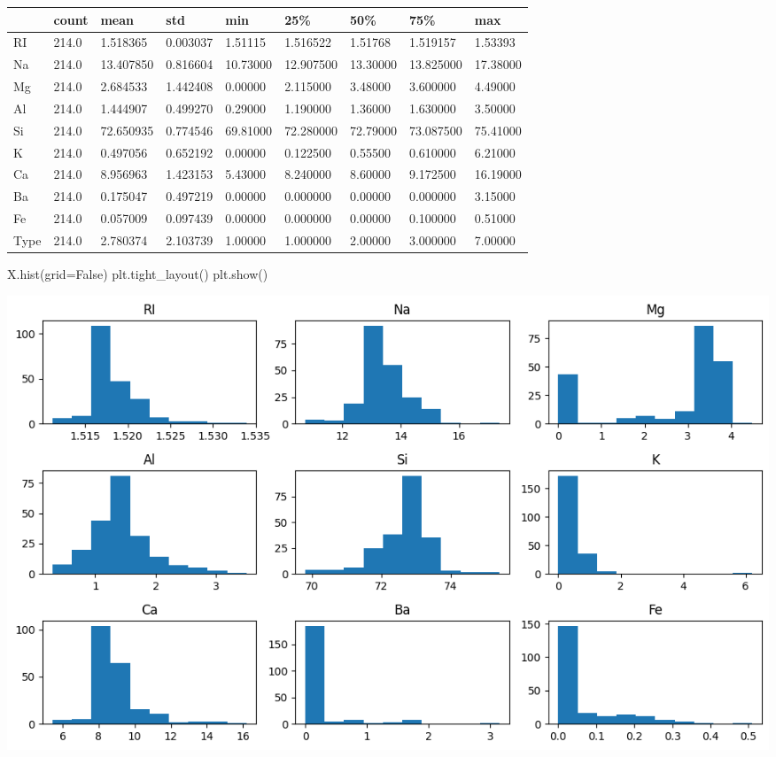 \documentclass[
  11pt,
]{article}
\newenvironment{Shaded}{\begin{snugshade}}{\end{snugshade}}
\newcommand{\NormalTok}[1]{\textcolor[rgb]{0.00,0.23,0.31}{#1}}
\newcommand{\OperatorTok}[1]{\textcolor[rgb]{0.37,0.37,0.37}{#1}}
\newcommand{\VariableTok}[1]{\textcolor[rgb]{0.07,0.07,0.07}{#1}}
\begin{document}
\begin{longtable}[]{@{}lllllllll@{}}
\toprule\noalign{}
& count & mean & std & min & 25\% & 50\% & 75\% & max \\
\midrule\noalign{}
\endhead
\bottomrule\noalign{}
\endlastfoot
RI & 214.0 & 1.518365 & 0.003037 & 1.51115 & 1.516522 & 1.51768 &
1.519157 & 1.53393 \\
Na & 214.0 & 13.407850 & 0.816604 & 10.73000 & 12.907500 & 13.30000 &
13.825000 & 17.38000 \\
Mg & 214.0 & 2.684533 & 1.442408 & 0.00000 & 2.115000 & 3.48000 &
3.600000 & 4.49000 \\
Al & 214.0 & 1.444907 & 0.499270 & 0.29000 & 1.190000 & 1.36000 &
1.630000 & 3.50000 \\
Si & 214.0 & 72.650935 & 0.774546 & 69.81000 & 72.280000 & 72.79000 &
73.087500 & 75.41000 \\
K & 214.0 & 0.497056 & 0.652192 & 0.00000 & 0.122500 & 0.55500 &
0.610000 & 6.21000 \\
Ca & 214.0 & 8.956963 & 1.423153 & 5.43000 & 8.240000 & 8.60000 &
9.172500 & 16.19000 \\
Ba & 214.0 & 0.175047 & 0.497219 & 0.00000 & 0.000000 & 0.00000 &
0.000000 & 3.15000 \\
Fe & 214.0 & 0.057009 & 0.097439 & 0.00000 & 0.000000 & 0.00000 &
0.100000 & 0.51000 \\
Type & 214.0 & 2.780374 & 2.103739 & 1.00000 & 1.000000 & 2.00000 &
3.000000 & 7.00000 \\
\end{longtable}

\begin{Shaded}
\begin{Highlighting}[]
\NormalTok{X.hist(grid}\OperatorTok{=}\VariableTok{False}\NormalTok{)}
\NormalTok{plt.tight\_layout()}
\NormalTok{plt.show()}
\end{Highlighting}
\end{Shaded}

\includegraphics{hw4_files/figure-pdf/cell-9-output-1.png}
\end{document}
